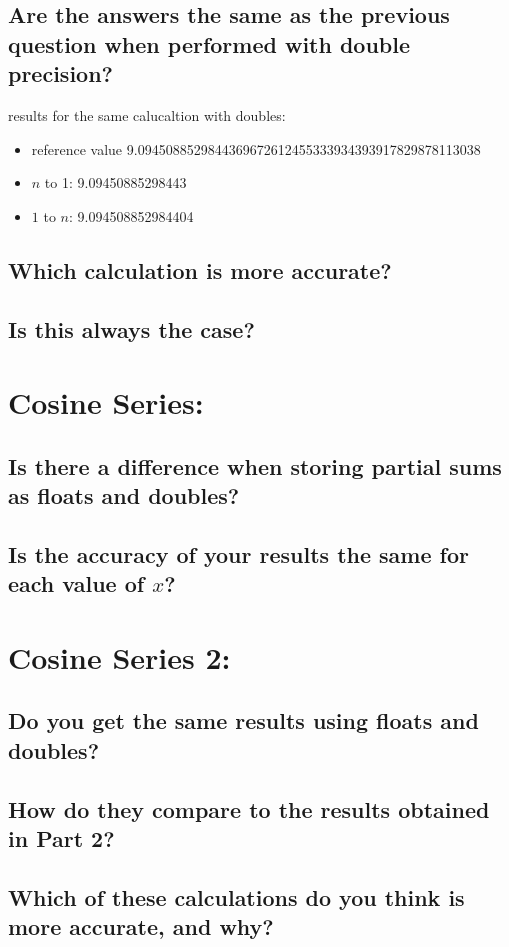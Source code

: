 \documentclass[12pt]{article}
\begin{document}
\subsection*{Are the answers the same as the previous question when performed with double precision?}
\item results for the same calucaltion with doubles:
\begin{itemize}
\item reference value 9.0945088529844369672612455333934393917829878113038
\item $n$ to 1: 9.09450885298443
\item $1$ to $n$: 9.094508852984404
\end{itemize}
\begin{itemize}
\subsection*{Which calculation is more accurate?}
\end{itemize}
\begin{itemize}
\subsection*{Is this always the case?}
\end{itemize} 

\section*{Cosine Series:}

\begin{itemize}
\subsection*{Is there a difference when storing partial sums as floats and doubles?}
\subsection*{Is the accuracy of your results the same for each value of $x$?}

\end{itemize}

\section*{Cosine Series 2:}
\begin{itemize} 
\subsection*{Do you get the same results using floats and doubles?}
\subsection*{How do they compare to the results obtained in Part 2?}
\subsection*{Which of these calculations do you think is more accurate, and why?}
\end{itemize} 
\end{document}
